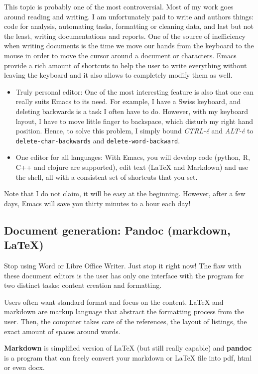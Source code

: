 \documentclass[11pt]{article}
\begin{document}
This topic is probably one of the most controversial.  Most of my work goes
around reading and writing. I am unfortunately paid to write and authors
things: code for analysis, automating tasks, formatting or cleaning data,
and last but not the least, writing documentations and reports.  One of the
source of inefficiency when writing documents is the time we move our hands
from the keyboard to the mouse in order to move the cursor around a document
or characters.  Emacs provide a rich amount of shortcuts to help the user to
write everything without leaving the keyboard and it also allows to
completely modify them as well.
\begin{itemize}
\item Truly personal editor: One of the most interesting feature is also
that one can really suits Emacs to its need. For example, I have a Swiss
keyboard, and deleting backwards is a task I often have to do. However,
with my keyboard layout, I have to move little finger to backspace, which
disturb my right hand position. Hence, to solve this problem, I simply
bound \emph{CTRL-é} and \emph{ALT-é} to \texttt{delete-char-backwards} and
\texttt{delete-word-backward}.
\item One editor for all languages: With Emacs, you will develop code (python,
R, C++ and clojure are supported), edit text (\LaTeX{} and Markdown) and use
the shell, all with a consistent set of shortcuts that you set.
\end{itemize}

Note that I do not claim, it will be easy at the beginning. However, after a
few days, Emacs will save you thirty minutes to a hour each day!

\subsection{Document generation: \textbf{Pandoc} (markdown, \LaTeX{})}
\label{sec:org45fb12c}
Stop using Word or Libre Office Writer. Just stop it right now!  The flaw
with these document editors is the user has only one interface with the
program for two distinct tasks: content creation and formatting.

Users often want standard format and focus on the content. \LaTeX{} and
markdown are markup language that abstract the formatting process from the
user. Then, the computer takes care of the references, the layout of
listings, the exact amount of spaces around words.

\textbf{Markdown} is simplified version of \LaTeX{} (but still really capable) and
\textbf{pandoc} is a program that can freely convert your markdown or \LaTeX{} file
into pdf, html or even docx.
\end{document}
